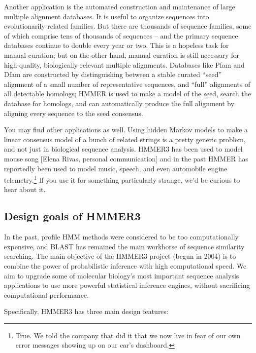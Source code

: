 Another application is the automated construction and maintenance
of large multiple alignment databases.  It is useful to organize
sequences into evolutionarily related families. But there are
thousands of 
sequence families, some of which comprise tens of
thousands of sequences -- and the primary sequence databases continue
to double every year or two. This is a hopeless task for manual
curation; but on the other hand, manual curation is still necessary
for high-quality, biologically relevant multiple alignments. Databases
like Pfam \citep{Finn10} and Dfam \citep{Wheeler13} are constructed by
distinguishing between a stable curated ``seed'' alignment of a small number
of representative sequences, and ``full'' alignments of all detectable
homologs; HMMER is used to make a model of the seed, search the database for
homologs, and can automatically produce the full alignment by aligning every
sequence to the seed consensus.

You may find other applications as well. Using hidden Markov models to
make a linear consensus model of a bunch of related strings is a
pretty generic problem, and not just in biological sequence analysis.
HMMER3 has been used to model mouse song [Elena Rivas, personal
  communication] and in the past HMMER has reportedly been used to
model music, speech, and even automobile engine
telemetry.\footnote{True. We told the company that did it that we now
  live in fear of our own error messages showing up on our car's
  dashboard.}  If you use it for something particularly strange, we'd
be curious to hear about it.


\subsection{Design goals of HMMER3}

In the past, profile HMM methods were considered to be too
computationally expensive, and BLAST has remained the main workhorse
of sequence similarity searching. The main objective of the HMMER3
project (begun in 2004) is to combine the power of probabilistic
inference with high computational speed. We aim to upgrade some of
molecular biology's most important sequence analysis applications to
use more powerful statistical inference engines, without sacrificing
computational performance.

Specifically, HMMER3 has three main design features:

